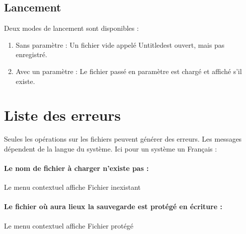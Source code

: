 \subsection{Lancement}
Deux modes de lancement sont disponibles :
\begin{enumerate}
	\item Sans paramètre : Un fichier vide appelé \og Untitled\fg est ouvert, mais pas enregistré.
	\item Avec un paramètre : Le fichier passé en paramètre est chargé et affiché s'il existe.
\end{enumerate}

\section{Liste des erreurs}
Seules les opérations sur les fichiers peuvent générer des erreurs. Les messages dépendent de la langue du système. Ici pour un système un Français :

\paragraph{Le nom de fichier à charger n'existe pas :} Le menu contextuel affiche \og Fichier inexistant\fg
\paragraph{Le fichier où aura lieux la sauvegarde est protégé en écriture :} Le menu contextuel affiche \og Fichier protégé\fg

